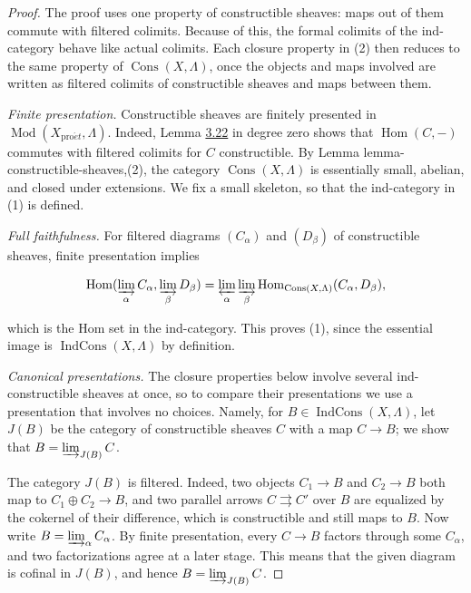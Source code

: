 \documentclass[11pt]{article}
\providecommand{\Cons}{}\renewcommand{\Cons}{\operatorname{Cons}}
\providecommand{\Hom}{}\renewcommand{\Hom}{\operatorname{Hom}}
\providecommand{\IndCons}{}\renewcommand{\IndCons}{\operatorname{IndCons}}
\begin{document}
\begin{proof}[{Proof}]\label{bp434}%
The proof uses one property of constructible sheaves: maps out of them commute with filtered colimits. Because of this, the formal colimits of the ind-category behave like actual colimits. Each closure property in (2) then reduces to the same property of \(\Cons(X,\Lambda)\), once the objects and maps involved are written as filtered colimits of constructible sheaves and maps between them.

\emph{Finite presentation.} Constructible sheaves are finitely presented in \(\operatorname{Mod}(X_{\mathrm{pro}\acute{e}t},\Lambda)\). Indeed, Lemma \hyperref[bp260]{3.22} in degree zero shows that \(\Hom(C,-)\) commutes with filtered colimits for \(C\) constructible. By Lemma lemma-constructible-sheaves,(2), the category \(\Cons(X,\Lambda)\) is essentially small, abelian, and closed under extensions. We fix a small skeleton, so that the ind-category in (1) is defined.

\emph{Full faithfulness.} For filtered diagrams \((C_\alpha)\) and \((D_\beta)\) of constructible sheaves, finite presentation implies

\[
\Hom(\varinjlim_\alpha C_\alpha,\varinjlim_\beta D_\beta)
=\varprojlim_\alpha\varinjlim_\beta\Hom_{\Cons(X,\Lambda)}(C_\alpha,D_\beta),
\]

which is the Hom set in the ind-category. This proves (1), since the essential image is \(\IndCons(X,\Lambda)\) by definition.

\emph{Canonical presentations.} The closure properties below involve several ind-constructible sheaves at once, so to compare their presentations we use a presentation that involves no choices. Namely, for \(B\in\IndCons(X,\Lambda)\), let \(J(B)\) be the category of constructible sheaves \(C\) with a map \(C\to B\); we show that \(B=\varinjlim_{J(B)}C\).

The category \(J(B)\) is filtered. Indeed, two objects \(C_1\to B\) and \(C_2\to B\) both map to \(C_1\oplus C_2\to B\), and two parallel arrows \(C\rightrightarrows C'\) over \(B\) are equalized by the cokernel of their difference, which is constructible and still maps to \(B\). Now write \(B=\varinjlim_\alpha C_\alpha\). By finite presentation, every \(C\to B\) factors through some \(C_\alpha\), and two factorizations agree at a later stage. This means that the given diagram is cofinal in \(J(B)\), and hence \(B=\varinjlim_{J(B)}C\).


\end{proof}
\end{document}
